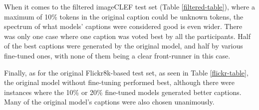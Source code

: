 \documentclass[11pt]{article}
\begin{document}
When it comes to the filtered imageCLEF test set (Table \ref{filtered-table}), where a maximum of 10\% tokens in the original caption could be unknown tokens, the spectrum of what models' captions were considered good is even wider. There was only one case where one caption was voted best by all the participants. Half of the best captions were generated by the original model, and half by various fine-tuned ones, with none of them being a clear front-runner in this case.

Finally, as for the original Flickr8k-based test set, as seen in Table \ref{flickr-table}, the original model without fine-tuning performed best, although there were instances where the 10\% or 20\% fine-tuned models generated better captions. Many of the original model's captions were also chosen unanimously.
\end{document}
